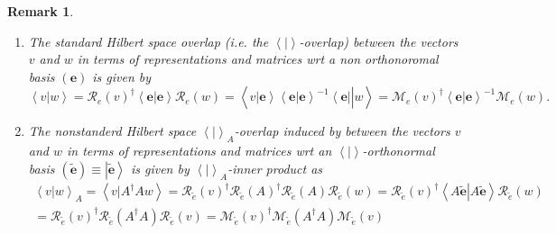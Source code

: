 \documentclass[aps,preprint]{revtex4}%
\newtheorem{remark}[theorem]{Remark}
\begin{document}
\begin{remark}
\begin{enumerate}
\item The standard Hilbert space overlap (i.e. the $\left\langle \left.
{}\right\vert \right\rangle $-overlap) between the vectors $v$ and $w$ in
terms of representations and matrices wrt a \emph{non} orthonoromal basis
$\left(  \mathbf{e}\right)  $ is given by
\begin{equation}
\left\langle \left.  v\right\vert w\right\rangle =\mathcal{R}_{e}\left(
v\right)  ^{\dagger}\left\langle \left.  \mathbf{e}\right\vert \mathbf{e}%
\right\rangle \mathcal{R}_{e}\left(  w\right)  =\left\langle \left.
v\left\vert \mathbf{e}\right\rangle \left\langle \left.  \mathbf{e}\right\vert
\mathbf{e}\right\rangle ^{-1}\left\langle \mathbf{e}\right\vert \right\vert
w\right\rangle =\mathcal{M}_{e}\left(  v\right)  ^{\dagger}\left\langle
\left.  \mathbf{e}\right\vert \mathbf{e}\right\rangle ^{-1}\mathcal{M}%
_{e}\left(  w\right)  .
\end{equation}


\item The nonstanderd Hilbert space $\left\langle \left.  {}\right\vert
\right\rangle _{A}$-overlap induced by between the vectors $v$ and $w$ in
terms of representations and matrices wrt an $\left\langle \left.
{}\right\vert \right\rangle $-orthonormal basis $\left(  \widetilde{\mathbf{e}%
}\right)  \equiv\left\vert \widetilde{\mathbf{e}}\right\rangle $ is given by
$\left\langle \left.  {}\right\vert \right\rangle _{A}$-inner product as
\begin{gather}
\left\langle \left.  v\right\vert w\right\rangle _{A}=\left\langle \left.
v\right\vert A^{\dagger}Aw\right\rangle =\mathcal{R}_{\widetilde{e}}\left(
v\right)  ^{\dagger}\mathcal{R}_{\widetilde{e}}\left(  A\right)  ^{\dagger
}\mathcal{R}_{\widetilde{e}}\left(  A\right)  \mathcal{R}_{\widetilde{e}%
}\left(  w\right)  =\mathcal{R}_{\widetilde{e}}\left(  v\right)  ^{\dagger
}\left\langle \left.  A\mathbf{\widetilde{e}}\right\vert
A\mathbf{\widetilde{e}}\right\rangle \mathcal{R}_{\widetilde{e}}\left(
w\right) \\
=\mathcal{R}_{\widetilde{e}}\left(  v\right)  ^{\dagger}\mathcal{R}%
_{\widetilde{e}}\left(  A^{\dagger}A\right)  \mathcal{R}_{\widetilde{e}%
}\left(  v\right)  =\mathcal{M}_{\widetilde{e}}\left(  v\right)  ^{\dagger
}\mathcal{M}_{\widetilde{e}}\left(  A^{\dagger}A\right)  \mathcal{M}%
_{\widetilde{e}}\left(  v\right)
\end{gather}



\end{enumerate}
\end{remark}
\end{document}
